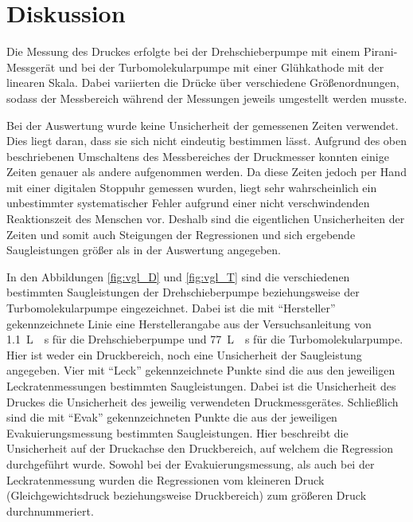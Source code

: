 \section{Diskussion}
\label{sec:Diskussion}

Die Messung des Druckes erfolgte bei der Drehschieberpumpe mit einem
Pirani-Messgerät und bei der Turbomolekularpumpe mit einer Glühkathode mit der
linearen Skala. Dabei variierten die Drücke über verschiedene Größenordnungen,
sodass der Messbereich während der Messungen jeweils umgestellt werden musste.

Bei der Auswertung wurde keine Unsicherheit der gemessenen Zeiten verwendet.
Dies liegt daran, dass sie sich nicht eindeutig bestimmen lässt.
Aufgrund des oben beschriebenen Umschaltens des Messbereiches der Druckmesser konnten
einige Zeiten genauer als andere aufgenommen werden.
Da diese Zeiten jedoch per Hand mit einer digitalen Stoppuhr gemessen wurden,
liegt sehr wahrscheinlich ein unbestimmter systematischer Fehler aufgrund einer
nicht verschwindenden Reaktionszeit des Menschen vor.
Deshalb sind die eigentlichen Unsicherheiten der Zeiten und somit auch
Steigungen der Regressionen und sich ergebende Saugleistungen größer als
in der Auswertung angegeben.

In den Abbildungen \ref{fig:vgl_D} und \ref{fig:vgl_T} sind die verschiedenen
bestimmten Saugleistungen der Drehschieberpumpe beziehungsweise der
Turbomolekularpumpe eingezeichnet.
Dabei ist die mit \enquote{Hersteller} gekennzeichnete Linie eine Herstellerangabe
aus der Versuchsanleitung \cite{anleitung} von \SI{1.1}{\liter{}\second}
für die Drehschieberpumpe und \SI{77}{\liter{}\second} für die
Turbomolekularpumpe. Hier ist weder ein Druckbereich, noch eine Unsicherheit der
Saugleistung angegeben.
Vier mit \enquote{Leck} gekennzeichnete Punkte sind die aus den jeweiligen
Leckratenmessungen bestimmten Saugleistungen. Dabei ist die Unsicherheit des
Druckes die Unsicherheit des jeweilig verwendeten Druckmessgerätes.
Schließlich sind die mit \enquote{Evak} gekennzeichneten Punkte die aus der
jeweiligen Evakuierungsmessung bestimmten Saugleistungen. Hier beschreibt die
Unsicherheit auf der Druckachse den Druckbereich, auf welchem die Regression
durchgeführt wurde.
Sowohl bei der Evakuierungsmessung, als auch bei der Leckratenmessung wurden die
Regressionen vom kleineren Druck (Gleichgewichtsdruck beziehungsweise Druckbereich)
zum größeren Druck durchnummeriert.

